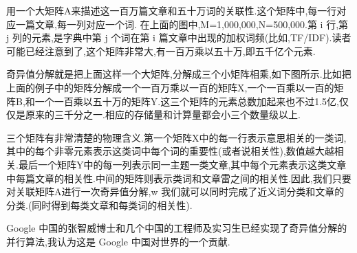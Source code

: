 \documentclass{article}
\begin{document}
用一个大矩阵A来描述这一百万篇文章和五十万词的关联性.这个矩阵中,每一行对应一篇文章,每一列对应一个词. 在上面的图中,M=1,000,000,N=500,000.第 i 行,第 j 列的元素,是字典中第 j 个词在第 i 篇文章中出现的加权词频(比如,TF/IDF).读者可能已经注意到了,这个矩阵非常大,有一百万乘以五十万,即五千亿个元素.

奇异值分解就是把上面这样一个大矩阵,分解成三个小矩阵相乘,如下图所示.比如把上面的例子中的矩阵分解成一个一百万乘以一百的矩阵X,一个一百乘以一百的矩阵B,和一个一百乘以五十万的矩阵Y.这三个矩阵的元素总数加起来也不过1.5亿,仅仅是原来的三千分之一.相应的存储量和计算量都会小三个数量级以上.

三个矩阵有非常清楚的物理含义.第一个矩阵X中的每一行表示意思相关的一类词,其中的每个非零元素表示这类词中每个词的重要性(或者说相关性),数值越大越相关.最后一个矩阵Y中的每一列表示同一主题一类文章,其中每个元素表示这类文章中每篇文章的相关性.中间的矩阵则表示类词和文章雷之间的相关性.因此,我们只要对关联矩阵A进行一次奇异值分解,w 我们就可以同时完成了近义词分类和文章的分类.(同时得到每类文章和每类词的相关性).

Google 中国的张智威博士和几个中国的工程师及实习生已经实现了奇异值分解的并行算法,我认为这是 Google 中国对世界的一个贡献.
\end{document}
